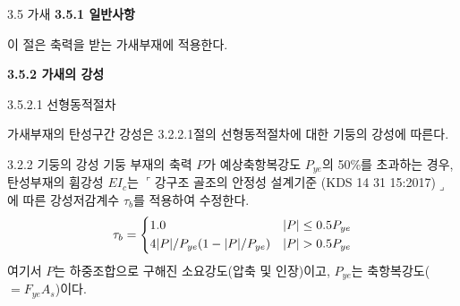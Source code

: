 
	\begin{frame}{3.5 가새}
	\textbf{3.5.1 일반사항}
	
	이 절은 축력을 받는 가새부재에 적용한다.  
	
	\textbf{3.5.2 가새의 강성}
	
	3.5.2.1 선형동적절차
	
	가새부재의 탄성구간 강성은 3.2.2.1절의 선형동적절차에 대한 기둥의 강성에 따른다. 
	\begin{block}{3.2.2 기둥의 강성}
기둥 부재의 축력 $P$가 예상축항복강도 $P_{ye}$의 50\%를 초과하는 경우, 탄성부재의 휨강성 $EI_c$는 $\ulcorner$강구조 골조의 안정성 설계기준 (KDS 14 31 15:2017)$\lrcorner$에 따른 강성저감계수 $\tau_b$를 적용하여 수정한다. 
	\[\tau_b = \begin{dcases}1.0 & \vert P\vert \leq 0.5 P_{ye} \\ 4\vert P\vert/P_{ye}(1 - \vert P\vert/P_{ye}) & \vert P\vert > 0.5 P_{ye}\end{dcases}\]
	\noindent 여기서 $P$는 하중조합으로 구해진 소요강도(압축 및 인장)이고, $P_{ye}$는 축항복강도($=F_{ye}A_s$)이다. 
	\end{block}
	\end{frame}


